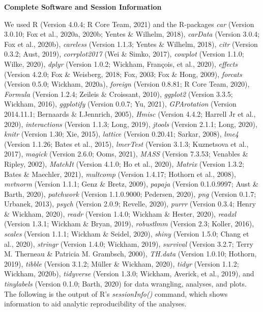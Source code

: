 \documentclass[
  english,
  man, noextraspace]{apa7}
\begin{document}
\begin{appendix}
\newpage

\noindent  \textbf{Complete Software and Session Information}

We used R (Version 4.0.4; R Core Team, 2021) and the R-packages
\emph{car} (Version 3.0.10; Fox et al., 2020a, 2020b; Yentes \& Wilhelm,
2018), \emph{carData} (Version 3.0.4; Fox et al., 2020b),
\emph{careless} (Version 1.1.3; Yentes \& Wilhelm, 2018), \emph{citr}
(Version 0.3.2; Aust, 2019), \emph{corrplot2017} (Wei \& Simko, 2017),
\emph{cowplot} (Version 1.1.0; Wilke, 2020), \emph{dplyr} (Version
1.0.2; Wickham, François, et al., 2020), \emph{effects} (Version 4.2.0;
Fox \& Weisberg, 2018; Fox, 2003; Fox \& Hong, 2009), \emph{forcats}
(Version 0.5.0; Wickham, 2020a), \emph{foreign} (Version 0.8.81; R Core
Team, 2020), \emph{Formula} (Version 1.2.4; Zeileis \& Croissant, 2010),
\emph{ggplot2} (Version 3.3.5; Wickham, 2016), \emph{ggplotify} (Version
0.0.7; Yu, 2021), \emph{GPArotation} (Version 2014.11.1; Bernaards \&
I.Jennrich, 2005), \emph{Hmisc} (Version 4.4.2; Harrell Jr et al.,
2020), \emph{interactions} (Version 1.1.3; Long, 2019), \emph{jtools}
(Version 2.1.1; Long, 2020), \emph{knitr} (Version 1.30; Xie, 2015),
\emph{lattice} (Version 0.20.41; Sarkar, 2008), \emph{lme4} (Version
1.1.26; Bates et al., 2015), \emph{lmerTest} (Version 3.1.3; Kuznetsova
et al., 2017), \emph{magick} (Version 2.6.0; Ooms, 2021), \emph{MASS}
(Version 7.3.53; Venables \& Ripley, 2002), \emph{MatchIt} (Version
4.1.0; Ho et al., 2020), \emph{Matrix} (Version 1.3.2; Bates \&
Maechler, 2021), \emph{multcomp} (Version 1.4.17; Hothorn et al., 2008),
\emph{mvtnorm} (Version 1.1.1; Genz \& Bretz, 2009), \emph{papaja}
(Version 0.1.0.9997; Aust \& Barth, 2020), \emph{patchwork} (Version
1.1.0.9000; Pedersen, 2020), \emph{png} (Version 0.1.7; Urbanek, 2013),
\emph{psych} (Version 2.0.9; Revelle, 2020), \emph{purrr} (Version
0.3.4; Henry \& Wickham, 2020), \emph{readr} (Version 1.4.0; Wickham \&
Hester, 2020), \emph{readxl} (Version 1.3.1; Wickham \& Bryan, 2019),
\emph{robustlmm} (Version 2.3; Koller, 2016), \emph{scales} (Version
1.1.1; Wickham \& Seidel, 2020), \emph{shiny} (Version 1.5.0; Chang et
al., 2020), \emph{stringr} (Version 1.4.0; Wickham, 2019),
\emph{survival} (Version 3.2.7; Terry M. Therneau \& Patricia M.
Grambsch, 2000), \emph{TH.data} (Version 1.0.10; Hothorn, 2019),
\emph{tibble} (Version 3.1.2; Müller \& Wickham, 2020), \emph{tidyr}
(Version 1.1.2; Wickham, 2020b), \emph{tidyverse} (Version 1.3.0;
Wickham, Averick, et al., 2019), and \emph{tinylabels} (Version 0.1.0;
Barth, 2020) for data wrangling, analyses, and plots.\\
The following is the output of R's \emph{sessionInfo()} command, which
shows information to aid analytic reproducibility of the analyses.


\end{appendix}
\end{document}
